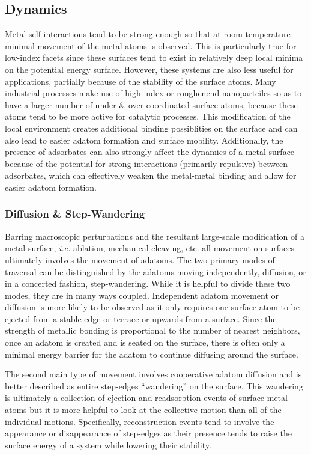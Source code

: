 \subsection{Dynamics}
Metal self-interactions tend to be strong enough so that at room temperature
minimal movement of the metal atoms is observed. This is particularly true for
low-index facets since these surfaces tend to exist in relatively deep local
minima on the potential energy surface. However, these systems are also less
useful for applications, partially because of the stability of the surface
atoms. Many industrial processes make use of high-index or roughenend
nanopartciles so as to have a larger number of under \& over-coordinated
surface atoms, because these atoms tend to be more active for catalytic
processes.\citep{Calle-Vallejo:2015qq, Stephens:2011bv} This modification of
the local environment creates additional binding possiblities on the surface
and can also lead to easier adatom formation and surface mobility.
Additionally, the presence of adsorbates can also strongly affect the dynamics
of a metal surface because of the potential for strong interactions (primarily
repulsive) between adsorbates, which can effectively weaken the metal-metal
binding and allow for easier adatom formation.


\subsubsection{Diffusion \& Step-Wandering}
Barring macroscopic perturbations and the resultant large-scale modification of
a metal surface, {\em i.e.} ablation, mechanical-cleaving, etc. all movement on
surfaces ultimately involves the movement of adatoms. The two primary modes of
traversal can be distinguished by the adatoms moving independently, diffusion,
or in a concerted fashion, step-wandering. While it is helpful to divide these
two modes, they are in many ways coupled.  Independent adatom movement or
diffusion is more likely to be observed as it only requires one surface atom to
be ejected from a stable edge or terrace or upwards from a surface.  Since the
strength of metallic bonding is proportional to the number of nearest
neighbors, once an adatom is created and is seated on the surface, there is
often only a minimal energy barrier for the adatom to continue diffusing around
the surface.

The second main type of movement involves cooperative adatom diffusion and is
better described as entire step-edges ``wandering'' on the surface. This
wandering is ultimately a collection of ejection and readsorbtion events of
surface metal atoms but it is more helpful to look at the collective motion
than all of the individual motions. Specifically, reconstruction events tend to
involve the appearance or disappearance of step-edges as their presence tends
to raise the surface energy of a system while lowering their stability.

